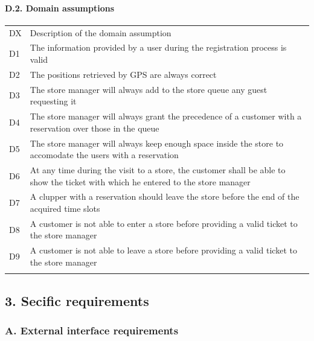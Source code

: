 \hypertarget{d.2.-domain-assumptions}{%
\paragraph{D.2. Domain assumptions}\label{d.2.-domain-assumptions}}

\begin{longtable}[]{@{}
  >{\raggedright\arraybackslash}p{}
  >{\raggedright\arraybackslash}p{}@{}}
\toprule
DX & Description of the domain assumption \\ \addlinespace
\midrule
\endhead
D1 & The information provided by a user during the registration process
is valid \\ \addlinespace
D2 & The positions retrieved by GPS are always correct \\ \addlinespace
D3 & The store manager will always add to the store queue any guest
requesting it \\ \addlinespace
D4 & The store manager will always grant the precedence of a customer
with a reservation over those in the queue \\ \addlinespace
D5 & The store manager will always keep enough space inside the store to
accomodate the users with a reservation \\ \addlinespace
D6 & At any time during the visit to a store, the customer shall be able
to show the ticket with which he entered to the store
manager \\ \addlinespace
D7 & A clupper with a reservation should leave the store before the end
of the acquired time slots \\ \addlinespace
D8 & A customer is not able to enter a store before providing a valid
ticket to the store manager \\ \addlinespace
D9 & A customer is not able to leave a store before providing a valid
ticket to the store manager \\ \addlinespace
\bottomrule
\end{longtable}

\hypertarget{secific-requirements}{%
\subsection{3. Secific requirements}\label{secific-requirements}}

\hypertarget{a.-external-interface-requirements}{%
\subsubsection{A. External interface
requirements}\label{a.-external-interface-requirements}}

